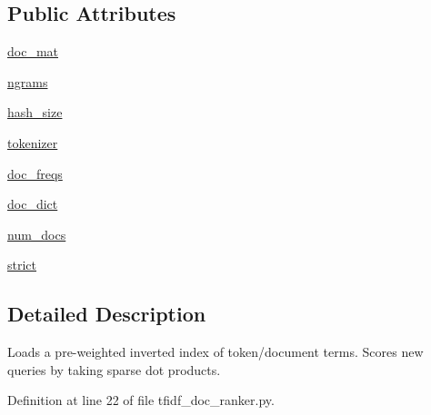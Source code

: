 \subsection*{Public Attributes}
\begin{DoxyCompactItemize}
\item 
\hyperlink{classparlai_1_1agents_1_1tfidf__retriever_1_1tfidf__doc__ranker_1_1TfidfDocRanker_ad36148d59e1bce7e5904899316317c61}{doc\+\_\+mat}
\item 
\hyperlink{classparlai_1_1agents_1_1tfidf__retriever_1_1tfidf__doc__ranker_1_1TfidfDocRanker_ab3d7c309a8de8cc664192169d95d9c87}{ngrams}
\item 
\hyperlink{classparlai_1_1agents_1_1tfidf__retriever_1_1tfidf__doc__ranker_1_1TfidfDocRanker_add0942063ebbb05487feadbe9b421d56}{hash\+\_\+size}
\item 
\hyperlink{classparlai_1_1agents_1_1tfidf__retriever_1_1tfidf__doc__ranker_1_1TfidfDocRanker_ae125548ea43894545541ae71fdc35ff7}{tokenizer}
\item 
\hyperlink{classparlai_1_1agents_1_1tfidf__retriever_1_1tfidf__doc__ranker_1_1TfidfDocRanker_a11677b2692fb3311eef1458762265ae9}{doc\+\_\+freqs}
\item 
\hyperlink{classparlai_1_1agents_1_1tfidf__retriever_1_1tfidf__doc__ranker_1_1TfidfDocRanker_af9cda5d944e01e08c45d0b3bbe6cb1ac}{doc\+\_\+dict}
\item 
\hyperlink{classparlai_1_1agents_1_1tfidf__retriever_1_1tfidf__doc__ranker_1_1TfidfDocRanker_a5fe0df360e9868ba2ce073ffc49a7d1b}{num\+\_\+docs}
\item 
\hyperlink{classparlai_1_1agents_1_1tfidf__retriever_1_1tfidf__doc__ranker_1_1TfidfDocRanker_a8c3f9e75f2a3b3ae127e87f25600c7fb}{strict}
\end{DoxyCompactItemize}


\subsection{Detailed Description}
\begin{DoxyVerb}Loads a pre-weighted inverted index of token/document terms.
Scores new queries by taking sparse dot products.
\end{DoxyVerb}
 

Definition at line 22 of file tfidf\+\_\+doc\+\_\+ranker.\+py.



